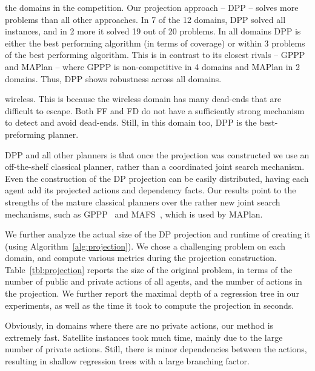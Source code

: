 \documentclass[letterpaper]{article}
\theoremstyle{definition}
\begin{document}
the domains in the competition. Our projection approach -- DPP -- solves more problems than all other approaches. In 7 of the 12 domains, DPP solved all instances, and in 2 more it solved 19 out of 20 problems. In all domains DPP is either the best performing algorithm (in terms of coverage) or within 3 problems of the best performing algorithm. This is in contrast to its closest rivals -- GPPP and MAPlan -- where GPPP is non-competitive in 4 domains and MAPlan in 2 domains. Thus, DPP shows robustness across all domains.


wireless. This is because the wireless domain has many dead-ends that are difficult to escape. Both FF and FD do not have a sufficiently strong mechanism to detect and avoid dead-ends. Still, in this domain too, DPP is the best-preforming planner.

DPP and all other planners is that once the projection was constructed we use an off-the-shelf classical planner, rather than a coordinated joint search mechanism. Even the construction of the DP projection can be easily distributed, having each agent add its projected actions and dependency facts.
Our results point to the strengths of the mature classical planners over the rather new joint search mechanisms, such as GPPP~\cite{maliah2014privacyPreserving} and MAFS~\cite{nissim2014distributed}, which is used by MAPlan.


We further analyze the actual size of the DP projection and runtime of creating it (using Algorithm~\ref{alg:projection}). We chose a challenging problem on each domain, and compute various metrics during the projection construction.  Table~\ref{tbl:projection} reports the size of the original problem, in terms of the number of public and private actions of all agents, and the number of actions in the projection. We further report the maximal depth of a regression tree in our experiments, as well as the time it took to compute the projection in seconds.

Obviously, in domains where there are no private actions, our method is extremely fast.
Satellite instances took much time, mainly due to the large number of private actions. Still, there is minor dependencies between the actions, resulting in shallow regression trees with a large branching factor.
\end{document}
